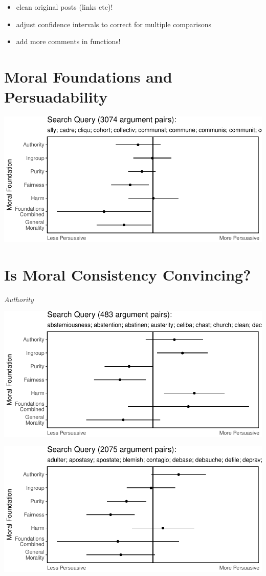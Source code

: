 \documentclass[11pt,]{article}
\providecommand{\tightlist}{%
\setlength{\itemsep}{0pt}\setlength{\parskip}{0pt}}
\begin{document}
\begin{itemize}
\tightlist
\item
  clean original posts (links etc)!
\item
  adjust confidence intervals to correct for multiple comparisons
\item
  add more comments in functions!
\end{itemize}

\section{Moral Foundations and
Persuadability}\label{moral-foundations-and-persuadability}

\includegraphics{prelim_files/figure-latex/unnamed-chunk-3-1.pdf}

\section{Is Moral Consistency
Convincing?}\label{is-moral-consistency-convincing}

\emph{Authority}

\includegraphics{prelim_files/figure-latex/unnamed-chunk-5-1.pdf}

\includegraphics{prelim_files/figure-latex/unnamed-chunk-6-1.pdf}
\end{document}
